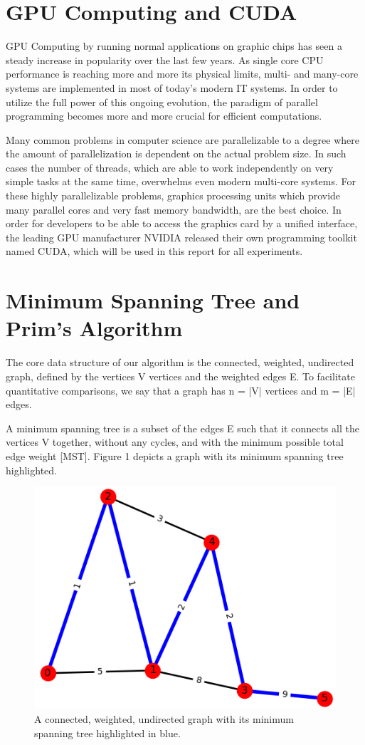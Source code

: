 \documentclass[sigconf,nonacm]{acmart}
\begin{document}
\section{GPU Computing and CUDA}

GPU Computing by running normal applications on graphic chips has seen a steady increase in popularity over the last few years. As single core CPU performance is reaching more and more its physical limits, multi- and many-core systems are implemented in most of today's modern IT systems. In order to utilize the full power of this ongoing evolution, the paradigm of parallel programming becomes more and more crucial for efficient computations.

Many common problems in computer science are parallelizable to a degree where the amount of parallelization is dependent on the actual problem size. In such cases the number of threads, which are able to work independently on very simple tasks at the same time, overwhelms even modern multi-core systems. For these highly parallelizable problems, graphics processing units which provide many parallel cores and very fast memory bandwidth, are the best choice. In order for developers to be able to access the graphics card by a unified interface, the leading GPU manufacturer NVIDIA released their own programming toolkit named CUDA, which will be used in this report for all experiments.

\section{Minimum Spanning Tree and Prim’s Algorithm}

The core data structure of our algorithm is the connected, weighted, undirected graph, defined by the vertices V vertices and the weighted edges E. To facilitate quantitative comparisons, we say that a graph has  n = |V| vertices and m = |E| edges.

A minimum spanning tree is a subset of the edges E such that it connects all the vertices V together, without any cycles, and with the minimum possible total edge weight [MST]. Figure 1 depicts a graph with its minimum spanning tree highlighted.


\begin{figure}
\centering
\includegraphics[width=0.7\linewidth]{graph-simple.png}
\caption{A connected, weighted, undirected graph with its minimum spanning tree highlighted in blue.}
\label{fig:graph-simple}
\end{figure}
\end{document}
